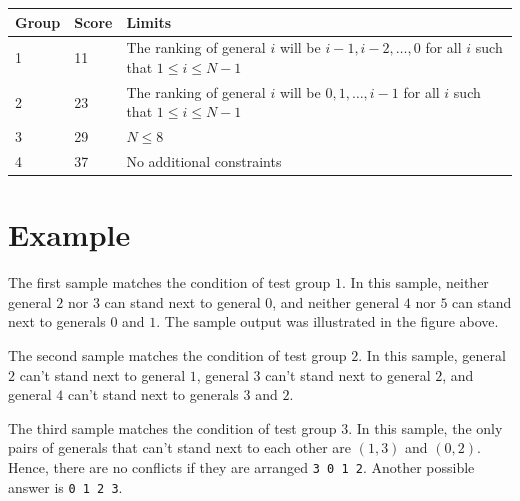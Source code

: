 \noindent
\begin{tabular}{| l | l | l |}
\hline
Group & Score & Limits \\ \hline
  1      & 11      & The ranking of general $i$ will be $i-1, i-2, \ldots, 0$ for all $i$ such that $1 \leq i \leq N-1$ \\ \hline
  2      & 23      & The ranking of general $i$ will be $0, 1, \ldots, i-1$ for all $i$ such that $1 \leq i \leq N-1$  \\ \hline
  3      & 29      & $N \leq 8$  \\ \hline
  4      & 37      & No additional constraints  \\ \hline
\end{tabular}

\section*{Example}

The first sample matches the condition of test group $1$. 
In this sample, neither general $2$ nor $3$ can stand next to general $0$, and neither general $4$ nor $5$ 
can stand next to generals $0$ and $1$. The sample output was illustrated in the figure above.

The second sample matches the condition of test group $2$. 
In this sample, general $2$ can't stand next to general $1$, general $3$ can't stand next to general $2$, 
and general $4$ can't stand next to generals $3$ and $2$.

The third sample matches the condition of test group $3$. 
In this sample, the only pairs of generals that can't stand next to each other are $(1, 3)$ and $(0, 2)$.
Hence, there are no conflicts if they are arranged \verb|3 0 1 2|. Another possible answer is \verb|0 1 2 3|.

